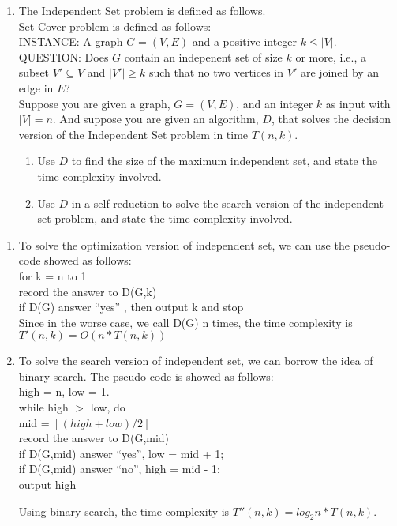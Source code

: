 \documentclass{article}%
\begin{document}
\begin{enumerate}
  \item The Independent Set problem is defined as follows.\\
  Set Cover problem is defined as follows:\\
  INSTANCE: A graph $G=(V,E)$ and a positive integer $k \leq |V|$.\\
  QUESTION: Does $G$ contain an indepenent set of size $k$ or more, i.e., a subset $V' \subseteq V$ and  $|V'| \geq k$ such that no two vertices in $V'$ are joined by an edge in $E$?\\
  Suppose you are given a graph, $G=(V,E)$, and an integer $k$ as input with $|V|=n$. And suppose you are given an algorithm, $D$, that solves the decision version of the Independent Set problem in time $T(n,k)$.
  	\begin {enumerate}
	\item Use $D$ to find the size of the maximum independent set, and state the time complexity involved.
	\item Use $D$ in a self-reduction to solve the search version of the independent set problem, and state the time complexity involved.  
	\end{enumerate}
	\end{enumerate}

\begin{enumerate}
	\item To solve the optimization version of independent set, we can use the pseudo-code showed as follows:\\
	
	for k = n to 1\\
	\hspace*{0.2in} record the answer to D(G,k)\\
	\hspace*{0.2in} if D(G) answer ``yes'' , then output k and stop \\
	
	Since in the worse case, we call D(G) n times, the time complexity is $T'(n,k)=O(n*T(n,k))$
	
	\item To solve the search version of independent set, we can borrow the idea of binary search. The pseudo-code is showed as follows:\\
	
	high = n, low = 1. \\
	while high $>$ low, do \\
	\hspace*{0.2in} mid = $\left\lceil (high + low) / 2\right\rceil$ \\
	\hspace*{0.2in} record the answer to D(G,mid) \\
	\hspace*{0.2in} if D(G,mid) answer ``yes'', low = mid + 1; \\
	\hspace*{0.2in} if D(G,mid) answer ``no'', high = mid - 1; \\
	output high
	
	Using binary search, the time complexity is $T''(n,k)=log_{2}n*T(n,k)$.
	
\end{enumerate}
\end{document}
